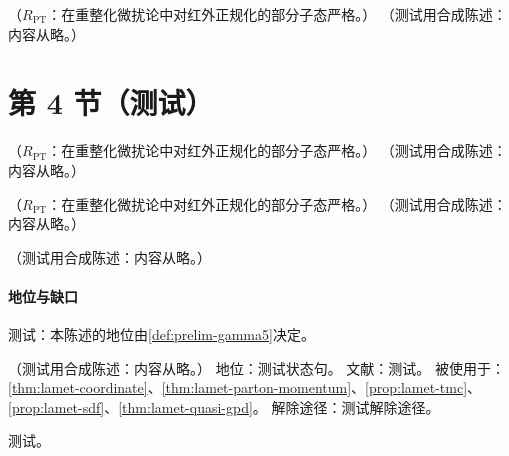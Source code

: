\begin{proposition}\label{prop:lamet-oneloop}
（$R_{\mathrm{PT}}$：在重整化微扰论中对红外正规化的部分子态严格。）
（测试用合成陈述：内容从略。）
\end{proposition}

\section{第 4 节（测试）}\label{sec:lattice-quasi}

\begin{proposition}\label{prop:lamet-tails}
（$R_{\mathrm{PT}}$：在重整化微扰论中对红外正规化的部分子态严格。）
（测试用合成陈述：内容从略。）
\end{proposition}

\begin{proposition}\label{prop:lamet-twoloop}
（$R_{\mathrm{PT}}$：在重整化微扰论中对红外正规化的部分子态严格。）
（测试用合成陈述：内容从略。）
\end{proposition}

\begin{proposition}\label{prop:lamet-polarized}
（测试用合成陈述：内容从略。）
\end{proposition}
\paragraph{地位与缺口}测试：本陈述的地位由\cref{def:prelim-gamma5}决定。

\begin{assumption}\label{asm:lamet-ope}
（测试用合成陈述：内容从略。）
地位：测试状态句。
文献：测试。
被使用于：\cref{thm:lamet-coordinate}、\cref{thm:lamet-parton-momentum}、\cref{prop:lamet-tmc}、\cref{prop:lamet-sdf}、\cref{thm:lamet-quasi-gpd}。
解除途径：测试解除途径。
\end{assumption}
\begin{proofsketch}测试。\end{proofsketch}

